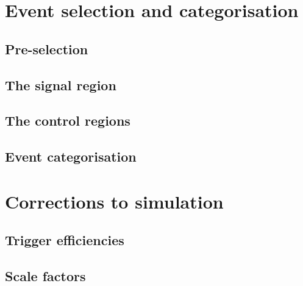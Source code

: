 \section{Event selection and categorisation}

\subsection{Pre-selection}

\subsection{The signal region}

\subsection{The control regions}

\subsection{Event categorisation}

\section{Corrections to simulation}

\subsection{Trigger efficiencies}

\subsection{Scale factors}

